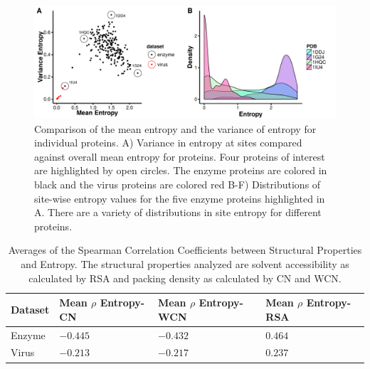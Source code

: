 \documentclass[12pt]{article}
\begin{document}
 
 
        \begin{figure}[H]
            \centerline{\includegraphics[width=7.5in]{protein_ex_plot.pdf}}     
            \caption{Comparison of the mean entropy and the variance of entropy for individual proteins. A)  Variance in entropy at sites compared against overall mean entropy for proteins. Four proteins of interest are highlighted by open circles. The enzyme proteins are colored in black and the virus proteins are colored red B-F) Distributions of site-wise entropy values for the five enzyme proteins highlighted in A. There are a variety of distributions in site entropy for different proteins.}
            \label{fig:protein_ex_plot}
    \end{figure}
     

\begin{center}
	\begin{table}[H]
	\begin{tabular}{| p{1.5cm} | p{2.5cm} | p{2cm} | p{2cm} | }
		\hline
		Dataset & Mean $\rho$ Entropy-CN  & Mean $\rho$ Entropy-WCN & Mean $\rho$ Entropy-RSA \\
		\hline	
		Enzyme &  $-0.445$  & $-0.432$ & $0.464$ \\[0.10cm]
	
		Virus & $-0.213$ & $-0.217$ & $0.237$ \\
		\hline	
	\end{tabular}
	\caption{Averages of the Spearman Correlation Coefficients between Structural Properties and Entropy. The structural properties analyzed are solvent accessibility as calculated by RSA and packing density as calculated by CN and WCN.}
	\label{table:entropy_stats}
	\end{table}
\end{center}
\end{document}
